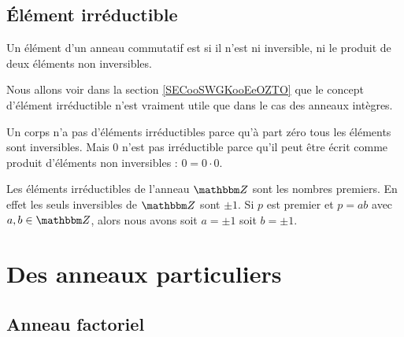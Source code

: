 \subsection{Élément irréductible}

\begin{definition}  \label{DeirredBDhQfA}
    Un élément d'un anneau commutatif est  si il n'est ni inversible, ni le produit de deux éléments non inversibles.
\end{definition}

\begin{normaltext}
    Nous allons voir dans la section \ref{SECooSWGKooEeOZTO} que le concept d'élément irréductible n'est vraiment utile que dans le cas des anneaux intègres.
\end{normaltext}

\begin{example}
    Un corps n'a pas d'éléments irréductibles parce qu'à part zéro tous les éléments sont inversibles. Mais \( 0\) n'est pas irréductible parce qu'il peut être écrit comme produit d'éléments non inversibles : \( 0=0\cdot 0\).
\end{example}

\begin{example}
    Les éléments irréductibles de l'anneau \( \eZ\) sont les nombres premiers. En effet les seuls inversibles de \( \eZ\) sont \( \pm 1\). Si \( p\) est premier et \( p=ab\) avec \( a,b\in \eZ\), alors nous avons soit \( a=\pm 1\) soit \( b=\pm 1\).
\end{example}

\section{Des anneaux particuliers}

\subsection{Anneau factoriel}

